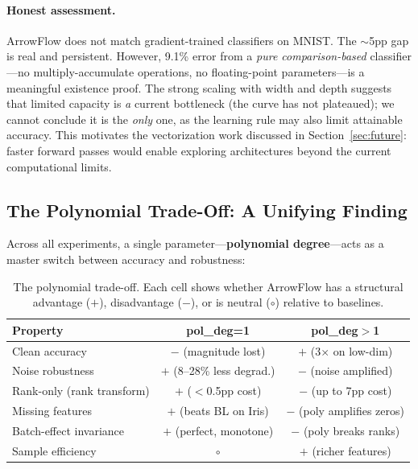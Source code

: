 \documentclass[12pt]{article}
\begin{document}
\paragraph{Honest assessment.} ArrowFlow does not match gradient-trained classifiers on MNIST. The $\sim$5pp gap is real and persistent. However, 9.1\% error from a \emph{pure comparison-based} classifier---no multiply-accumulate operations, no floating-point parameters---is a meaningful existence proof. The strong scaling with width and depth suggests that limited capacity is \emph{a} current bottleneck (the curve has not plateaued); we cannot conclude it is the \emph{only} one, as the learning rule may also limit attainable accuracy. This motivates the vectorization work discussed in Section~\ref{sec:future}: faster forward passes would enable exploring architectures beyond the current computational limits.


\subsection{The Polynomial Trade-Off: A Unifying Finding}
\label{sec:tradeoff}

Across all experiments, a single parameter---\textbf{polynomial degree}---acts as a master switch between accuracy and robustness:

\begin{table}[ht]
\centering
\caption{The polynomial trade-off. Each cell shows whether ArrowFlow has a structural advantage ($+$), disadvantage ($-$), or is neutral ($\circ$) relative to baselines.}
\label{tab:tradeoff}
\begin{tabular}{lcc}
\toprule
Property & pol\_deg=1 & pol\_deg$>$1 \\
\midrule
Clean accuracy          & $-$ (magnitude lost)        & $+$ (3$\times$ on low-dim) \\
Noise robustness        & $+$ (8--28\% less degrad.)  & $-$ (noise amplified) \\
Rank-only (rank transform)& $+$ ($<$0.5pp cost)         & $-$ (up to 7pp cost) \\
Missing features        & $+$ (beats BL on Iris)      & $-$ (poly amplifies zeros) \\
Batch-effect invariance & $+$ (perfect, monotone)     & $-$ (poly breaks ranks) \\
Sample efficiency       & $\circ$                     & $+$ (richer features) \\
\bottomrule
\end{tabular}
\end{table}
\end{document}

